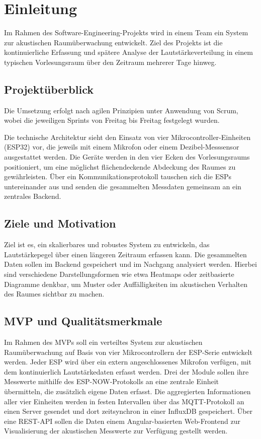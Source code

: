 \chapter{Einleitung}

Im Rahmen des Software-Engineering-Projekts wird in einem Team ein System zur akustischen Raumüberwachung entwickelt. 
Ziel des Projekts ist die kontinuierliche Erfassung und spätere Analyse der Lautstärkeverteilung in einem typischen Vorlesungsraum über den Zeitraum mehrerer Tage hinweg.

\section{Projektüberblick}

Die Umsetzung erfolgt nach agilen Prinzipien unter Anwendung von Scrum, wobei die jeweiligen Sprints von Freitag bis Freitag festgelegt wurden. 

Die technische Architektur sieht den Einsatz von vier Mikrocontroller-Einheiten (ESP32) vor, die jeweils mit einem Mikrofon oder einem Dezibel-Messsensor ausgestattet werden. 
Die Geräte werden in den vier Ecken des Vorlesungsraums positioniert, um eine möglichst flächendeckende Abdeckung des Raumes zu gewährleisten. Über ein Kommunikationsprotokoll tauschen sich die ESPs untereinander aus und 
senden die gesammelten Messdaten gemeinsam an ein zentrales Backend.

\section{Ziele und Motivation}

Ziel ist es, ein skalierbares und robustes System zu entwickeln, das Lautstärkepegel über einen längeren Zeitraum erfassen kann. Die gesammelten Daten sollen im Backend gespeichert und im Nachgang analysiert werden. 
Hierbei sind verschiedene Darstellungsformen wie etwa Heatmaps oder zeitbasierte Diagramme denkbar, um Muster oder Auffälligkeiten im akustischen Verhalten des Raumes sichtbar zu machen.

\section{MVP und Qualitätsmerkmale}

Im Rahmen des MVPs soll ein verteiltes System zur akustischen Raumüberwachung auf Basis von vier Mikrocontrollern der ESP-Serie entwickelt werden. 
Jeder ESP wird über ein extern angeschlossenes Mikrofon verfügen, mit dem kontinuierlich Lautstärkedaten erfasst werden. Drei der Module sollen ihre Messwerte mithilfe des ESP-NOW-Protokolls an eine zentrale Einheit übermitteln, 
die zusätzlich eigene Daten erfasst. Die aggregierten Informationen aller vier Einheiten werden in festen Intervallen über das MQTT-Protokoll an einen Server gesendet und dort zeitsynchron in einer InfluxDB gespeichert. 
Über eine REST-API sollen die Daten einem Angular-basierten Web-Frontend zur Visualisierung der akustischen Messwerte zur Verfügung gestellt werden.

